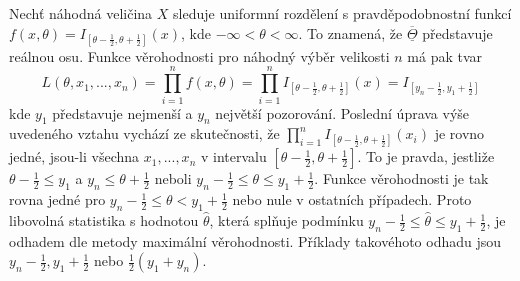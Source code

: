 \begin{example}
Nechť náhodná veličina $X$ sleduje uniformní rozdělení s pravděpodobnostní funkcí $f(x, \theta) = I_{[\theta - \frac{1}{2}, \theta + \frac{1}{2}]}(x)$, kde $-\infty < \theta < \infty$. To znamená, že $\overline{\underline{\Theta}}$ představuje reálnou osu. Funkce věrohodnosti pro náhodný výběr velikosti $n$ má pak tvar
\begin{equation*}
L(\theta, x_1, ..., x_n) = \prod_{i = 1}^n f(x, \theta) = \prod_{i = 1}^n I_{[\theta - \frac{1}{2}, \theta + \frac{1}{2}]}(x) = I_{[y_n - \frac{1}{2}, y_1 + \frac{1}{2}]}
\end{equation*}
kde $y_1$ představuje nejmenší a $y_n$ největší pozorování. Poslední úprava výše uvedeného vztahu vychází ze skutečnosti, že $\prod_{i = 1}^n I_{[\theta - \frac{1}{2}, \theta + \frac{1}{2}]}(x_i)$ je rovno jedné, jsou-li všechna $x_1, ..., x_n$ v intervalu $[\theta - \frac{1}{2}, \theta + \frac{1}{2}]$. To je pravda, jestliže $\theta - \frac{1}{2} \le y_1$ a $y_n \le \theta + \frac{1}{2}$ neboli $y_n - \frac{1}{2} \le \theta \le y_1 + \frac{1}{2}$. Funkce věrohodnosti je tak rovna jedné pro $y_n - \frac{1}{2} \le \theta < y_1 + \frac{1}{2}$ nebo nule v ostatních případech. Proto libovolná statistika s hodnotou $\hat{\theta}$, která splňuje podmínku $y_n - \frac{1}{2} \le \hat{\theta} \le y_1 + \frac{1}{2}$, je odhadem dle metody maximální věrohodnosti. Příklady takovéhoto odhadu jsou $y_n - \frac{1}{2}, y_1 + \frac{1}{2}$ nebo $\frac{1}{2}(y_1 + y_n)$.
\end{example}

